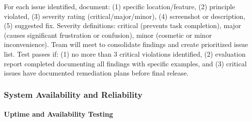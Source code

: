 \documentclass[12pt, titlepage]{article}
\begin{document}
\begin{enumerate}
For each issue identified, document: (1) specific location/feature, (2) principle violated, (3) severity rating (critical/major/minor), (4) screenshot or description, (5) suggested fix. Severity definitions: critical (prevents task completion), major (causes significant frustration or confusion), minor (cosmetic or minor inconvenience). Team will meet to consolidate findings and create prioritized issue list. Test passes if: (1) no more than 3 critical violations identified, (2) evaluation report completed documenting all findings with specific examples, and (3) critical issues have documented remediation plans before final release.

\end{enumerate}

\subsubsection{System Availability and Reliability}

\paragraph{Uptime and Availability Testing}
\end{document}
